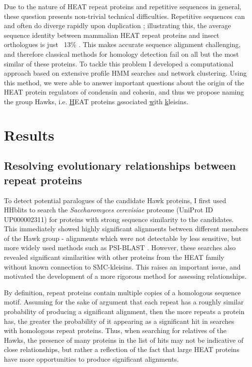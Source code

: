 \documentclass[a4paper,11pt,twoside,openright]{scrbook}
\begin{document}
Due to the nature of HEAT repeat proteins and repetitive sequences in general, these question presents non-trivial technical difficulties. Repetitive sequences can and often do diverge rapidly upon duplication \cite{Persi2016}; illustrating this, the average sequence identity between mammalian HEAT repeat proteins and insect orthologues is just ~13\% \cite{Andrade2001c}. This makes accurate sequence alignment challenging, and therefore classical methods for homology detection fail on all but the most similar of these proteins. To tackle this problem I developed a computational approach based on extensive profile HMM searches and network clustering. Using this method, we were able to answer important questions about the origin of the HEAT protein regulators of condensin and cohesin, and thus we propose naming the group Hawks, i.e. \underline{H}EAT proteins \underline{a}ssociated \underline{w}ith \underline{k}leisins.

\section{Results}
\subsection{Resolving evolutionary relationships between repeat proteins}
To detect potential paralogues of the candidate Hawk proteins, I first used HHblits \cite{Remmert2011} to search the \textit{Saccharomyces cerevisiae} proteome (UniProt ID UP000002311) for proteins with strong sequence similarity to the candidates. This immediately showed highly significant alignments between different members of the Hawk group - alignments which were not detectable by less sensitive, but more widely used methods such as PSI-BLAST \cite{Altschul1997}. However, these searches also revealed significant similarities with other proteins from the HEAT family without known connection to SMC-kleisins. This raises an important issue, and motivated the development of a more rigorous method for assessing relationships.

By definition, repeat proteins contain multiple copies of a homologous sequence motif. Assuming for the sake of argument that each repeat has a roughly similar probability of producing a significant alignment, then the more repeats a protein has, the greater the probability of it appearing as a significant hit in searches with homologous repeat proteins. Thus, when searching for relatives of the Hawks, the presence of many proteins in the list of hits may not be indicative of close relationships, but rather a reflection of the fact that large HEAT proteins have more opportunities to produce significant alignments.
\end{document}
